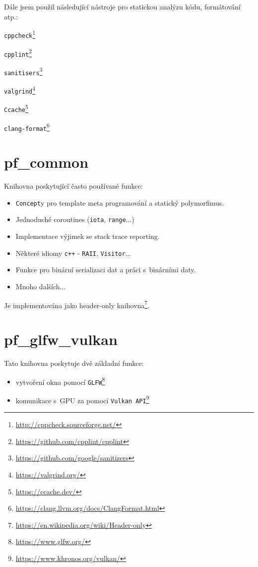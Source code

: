Dále jsem použil následující nástroje pro statickou analýzu kódu, formátování atp.:
\begin{itemize}
\end{itemize}

\section{pf\_common}
Knihovna poskytující často používané funkce:
\begin{itemize}
	\item \texttt{Concept}y pro template meta programování a statický polymorfimus.
	\item Jednoduché coroutines (\texttt{iota}, \texttt{range}...)
	\item Implementace výjimek se stack trace reporting.
	\item Některé idiomy \texttt{c++} - \texttt{RAII}, \texttt{Visitor}...
	\item Funkce pro binární serializaci dat a práci s~binárními daty.
	\item Mnoho dalších...
\end{itemize}

Je implementována jako header-only knihovna\footnote{\url{https://en.wikipedia.org/wiki/Header-only}}.

\section{pf\_glfw\_vulkan}
Tato knihovna poskytuje dvě základní funkce:
\begin{itemize}
	\item vytvoření okna pomocí \texttt{GLFW}\footnote{\url{https://www.glfw.org/}}
	\item komunikace s~GPU za pomocí \texttt{Vulkan API}\footnote{\url{https://www.khronos.org/vulkan/}}
\end{itemize}

